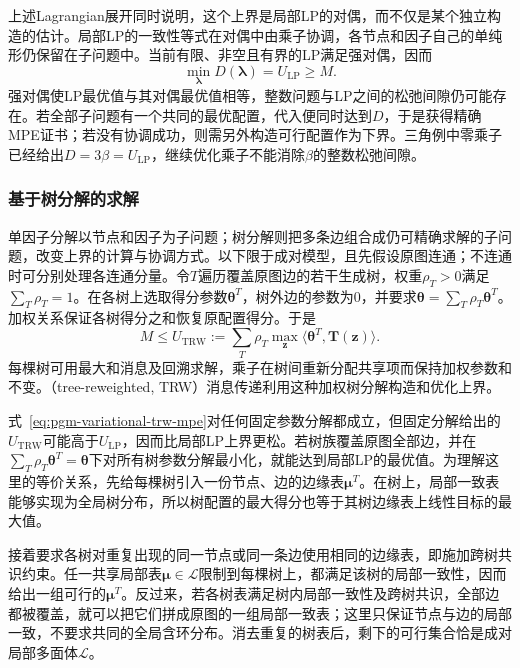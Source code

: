上述Lagrangian展开同时说明，这个上界是局部LP的对偶，而不仅是某个独立构造的估计。局部LP的一致性等式在对偶中由乘子协调，各节点和因子自己的单纯形仍保留在子问题中。当前有限、非空且有界的LP满足强对偶，因而
\begin{equation}
  \min_{\bm{\lambda}}D(\bm{\lambda})=U_{\mathrm{LP}}\geq M.
  \label{eq:pgm-variational-dual-lp}
\end{equation}
强对偶使LP最优值与其对偶最优值相等，整数问题与LP之间的松弛间隙仍可能存在。若全部子问题有一个共同的最优配置，代入便同时达到$D$，于是获得精确MPE证书；若没有协调成功，则需另外构造可行配置作为下界。三角例中零乘子已经给出$D=3\beta=U_{\mathrm{LP}}$，继续优化乘子不能消除$\beta$的整数松弛间隙。

\subsubsection{基于树分解的求解}

\label{sec:pgm-variational-trw-mpe}

单因子分解以节点和因子为子问题；树分解则把多条边组合成仍可精确求解的子问题，改变上界的计算与协调方式。以下限于成对模型，且先假设原图连通；不连通时可分别处理各连通分量。令$T$遍历覆盖原图边的若干生成树，权重$\rho_T>0$满足$\sum_T\rho_T=1$。在各树上选取得分参数$\bm{\theta}^T$，树外边的参数为$0$，并要求$\bm{\theta}=\sum_T\rho_T\bm{\theta}^T$。加权关系保证各树得分之和恢复原配置得分。于是
\begin{equation}
  M\leq U_{\mathrm{TRW}}
     :=\sum_T\rho_T\max_{\bm z}
                    \langle\bm{\theta}^T,\bm T(\bm z)\rangle.
  \label{eq:pgm-variational-trw-mpe}
\end{equation}
每棵树可用最大和消息及回溯求解，乘子在树间重新分配共享项而保持加权参数和不变。（tree-reweighted, TRW）消息传递利用这种加权树分解构造和优化上界。

式~\eqref{eq:pgm-variational-trw-mpe}对任何固定参数分解都成立，但固定分解给出的$U_{\mathrm{TRW}}$可能高于$U_{\mathrm{LP}}$，因而比局部LP上界更松。若树族覆盖原图全部边，并在$\sum_T\rho_T\bm{\theta}^T=\bm{\theta}$下对所有树参数分解最小化，就能达到局部LP的最优值。为理解这里的等价关系，先给每棵树引入一份节点、边的边缘表$\bm\mu^T$。在树上，局部一致表能够实现为全局树分布，所以树配置的最大得分也等于其树边缘表上线性目标的最大值。

接着要求各树对重复出现的同一节点或同一条边使用相同的边缘表，即施加跨树共识约束。任一共享局部表$\bm\mu\in\mathcal L$限制到每棵树上，都满足该树的局部一致性，因而给出一组可行的$\bm\mu^T$。反过来，若各树表满足树内局部一致性及跨树共识，全部边都被覆盖，就可以把它们拼成原图的一组局部一致表；这里只保证节点与边的局部一致，不要求共同的全局含环分布。消去重复的树表后，剩下的可行集合恰是成对局部多面体$\mathcal L$。

